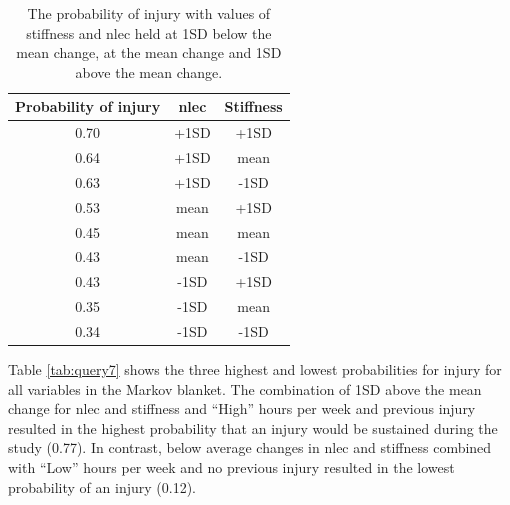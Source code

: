 \documentclass[man,floatsintext]{apa6}
\begin{document}
\begin{table}[H]

\begin{center}
\begin{threeparttable}

\caption{\label{tab:query6}The probability of injury with values of stiffness and nlec held at 1SD below the mean change, at the mean change and 1SD above the mean change.}

\begin{tabular}{ccc}
\toprule
Probability of injury & nlec & Stiffness\\
\midrule
0.70 & +1SD & +1SD\\
0.64 & +1SD & mean\\
0.63 & +1SD & -1SD\\
0.53 & mean & +1SD\\
0.45 & mean & mean\\
0.43 & mean & -1SD\\
0.43 & -1SD & +1SD\\
0.35 & -1SD & mean\\
0.34 & -1SD & -1SD\\
\bottomrule
\end{tabular}

\end{threeparttable}
\end{center}

\end{table}

Table \ref{tab:query7} shows the three highest and lowest probabilities for injury for all variables in the Markov blanket.
The combination of 1SD above the mean change for nlec and stiffness and \enquote{High} hours per week and previous injury resulted in the highest probability that an injury would be sustained during the study (0.77).
In contrast, below average changes in nlec and stiffness combined with \enquote{Low} hours per week and no previous injury resulted in the lowest probability of an injury (0.12).
\end{document}

